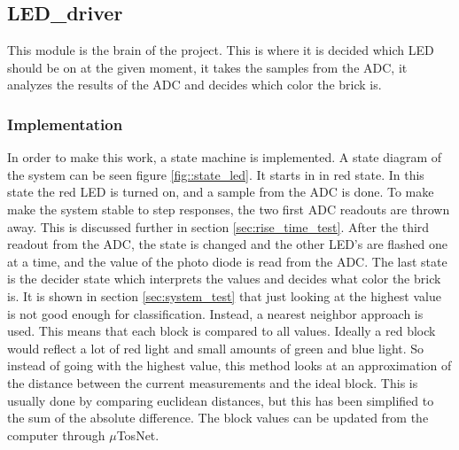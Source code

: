 \subsection{LED\_driver}
This module is the brain of the project. This is where it is decided which LED should be on at the given moment, it takes the samples from the ADC, it analyzes the results of the ADC and decides which color the brick is.

\subsubsection{Implementation}
In order to make this work, a state machine is implemented. 
A state diagram of the system can be seen figure \ref{fig::state_led}. 
It starts in in red state. 
In this state the red LED is turned on, and a sample from the ADC is done. 
To make make the system stable to step responses, the two first ADC readouts are thrown away.
This is discussed further in section \ref{sec:rise_time_test}.
After the third readout from the ADC, the state is changed and the other LED's are flashed one at a time, and the value of the photo diode is read from the ADC. 
The last state is the decider state which interprets the values and decides what color the brick is.
It is shown in section \ref{sec:system_test} that just looking at the highest value is not good enough for classification.
Instead, a nearest neighbor approach is used.
This means that each block is compared to all values.
Ideally a red block would reflect a lot of red light and small amounts of green and blue light.
So instead of going with the highest value, this method looks at an approximation of the distance between the current measurements and the ideal block.
This is usually done by comparing euclidean distances, but this has been simplified to the sum of the absolute difference.
The block values can be updated from the computer through $\mu$TosNet. 

